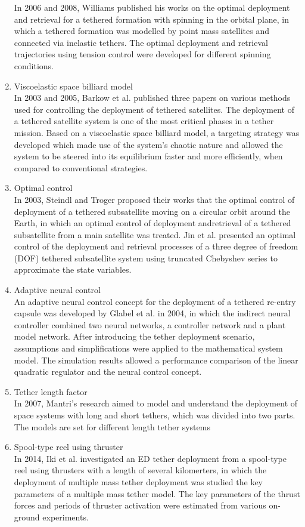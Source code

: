 \begin{enumerate}
In 2006 and 2008, Williams published his works on the optimal deployment and retrieval for a tethered formation with spinning in the orbital plane, in which a tethered formation was modelled by point mass satellites and connected via inelastic tethers. The optimal deployment and retrieval trajectories using tension control were developed for different spinning conditions.


\item Viscoelastic space billiard model\\
In 2003 and 2005, Barkow et al. published three papers on various methods used for controlling the deployment of tethered satellites. The deployment of a tethered satellite system is one of the most critical
phases in a tether mission. Based on a viscoelastic space billiard model, a targeting strategy
was developed which made use of the system's chaotic nature and allowed the system to be steered into its equilibrium faster and more efficiently, when compared to conventional strategies.

\item Optimal control\\
In 2003, Steindl and Troger proposed their works that the optimal control of deployment of a tethered subsatellite moving on a circular orbit around the Earth, in which an optimal control of deployment andretrieval of a tethered subsatellite from a main satellite was treated.
Jin et al. presented an optimal control of the deployment and retrieval processes of a three degree
of freedom (DOF) tethered subsatellite system using truncated Chebyshev series to approximate the state
variables.

\item Adaptive neural control\\
An adaptive neural control concept for the deployment of a tethered re-entry capsule was developed by
Glabel et al. in 2004, in which the indirect neural controller combined two neural networks, a controller network and a plant model network. After introducing the tether deployment scenario, assumptions and simplifications were applied to the mathematical system model. The simulation results allowed a performance comparison of the linear quadratic regulator and the neural control concept.
\item Tether length factor\\
In 2007, Mantri's research aimed to model and understand the deployment of space systems with long
and short tethers, which was divided into two parts. The models are set for different length tether systems 

\item Spool-type reel using thruster \\
In 2014, Iki et al. investigated an ED tether deployment from a spool-type reel using thrusters with
a length of several kilomerters, in which the deployment of multiple mass tether deployment was studied
the key parameters of a multiple mass tether model. The key parameters of the thrust forces and periods
of thruster activation were estimated from various on-ground experiments.

\end{enumerate}



